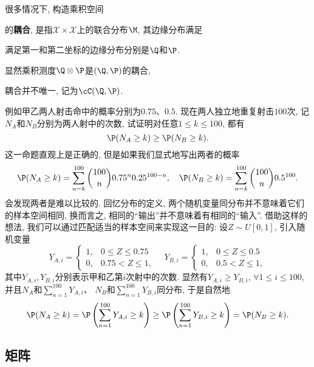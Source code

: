 很多情况下, 构造乘积空间

的\textbf{耦合}, 是指$\mathcal{X} \times \mathcal{X}$上的联合分布$\M$, 其边缘分布满足

满足第一和第二坐标的边缘分布分别是$\Q$和$\P$.


显然乘积测度$\Q \otimes \P$是$(\Q, \P)$的耦合, 

耦合并不唯一, 记为$\cC(\Q, \P)$. 

\begin{example}
	例如甲乙两人射击命中的概率分别为$0.75$、$0.5$. 
	现在两人独立地重复射击$100$次, 记$N_A$和$N_B$分别为两人射中的次数, 试证明对任意$1 \leq k \leq 100$, 都有
	\begin{equation*}
		\P(N_A \geq k) \geq \P(N_B \geq k). 
	\end{equation*}
	这一命题直观上是正确的, 但是如果我们显式地写出两者的概率
	\begin{equation*}
		\P(N_A \geq k) = \sum_{n=k}^{100} \binom{100}{n} 0.75^n 0.25^{100 - n}, \quad
		\P(N_B \geq k) = \sum_{n=k}^{100} \binom{100}{n} 0.5^{100}.  
	\end{equation*}
	会发现两者是难以比较的. 
 	回忆分布的定义, 两个随机变量同分布并不意味着它们的样本空间相同, 换而言之, 相同的“输出”并不意味着有相同的“输入”. 
 	借助这样的想法, 我们可以通过匹配适当的样本空间来实现这一目的: 设$Z \sim U[0,1]$, 引入随机变量
 	\begin{equation*}
 		Y_{A,i} = 
 		\begin{cases}
 			1, & 0 \leq Z \leq 0.75 \\ 0, &0.75 < Z \leq 1, 
 		\end{cases}
 		\quad
 		Y_{B,i} = 
 		\begin{cases}
 			1, & 0 \leq Z \leq 0.5 \\ 0, &0.5 < Z \leq 1, 
 		\end{cases}
 	\end{equation*}
 	其中$Y_{A,i}, Y_{B,i}$分别表示甲和乙第$i$次射中的次数. 
 	显然有$Y_{A,i} \geq Y_{B,i}$, $\forall 1 \leq i \leq 100$, 并且$N_A$和$\sum_{n=1}^{100} Y_{A,i}$、 $N_B$和$\sum_{n=1}^{100} Y_{B,i}$同分布, 于是自然地
 	\begin{equation*}
 		\P(N_A \geq k) 
 		= \P\left(\sum_{n=1}^{100} Y_{A,i} \geq k \right)
 		\geq \P\left(\sum_{n=1}^{100} Y_{B,i} \geq k \right) 
 		= \P(N_B \geq k).
 	\end{equation*}
\end{example}

\subsection{矩阵}

